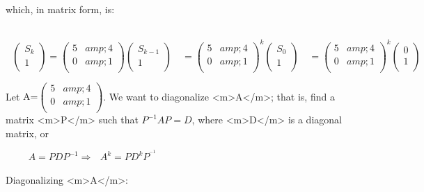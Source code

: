     which, in matrix form, is:



$\quad \quad $\(\text{     }\left(
\begin{array}{c}
 S_k \\
 1 \\
\end{array}
\right)=\left(
\begin{array}{cc}
 5 &amp; 4 \\
 0 &amp; 1 \\
\end{array}
\right)\left(
\begin{array}{c}
 S_{k-1} \\
 1 \\
\end{array}
\right)\quad =\left(
\begin{array}{cc}
 5 &amp; 4 \\
 0 &amp; 1 \\
\end{array}
\right)^k\left(
\begin{array}{c}
 S_0 \\
 1 \\
\end{array}
\right)\quad =\left(
\begin{array}{cc}
 5 &amp; 4 \\
 0 &amp; 1 \\
\end{array}
\right)^k\left(
\begin{array}{c}
 0 \\
 1 \\
\end{array}
\right)\quad\)



 



Let \(\text{A=}\left(
\begin{array}{cc}
 5 &amp; 4 \\
 0 &amp; 1 \\
\end{array}
\right)\).  We want to diagonalize <m>A</m>; that is,  find a matrix <m>P</m> such that \(P^{-1}A P = D\), where <m>D</m> is a diagonal
matrix,  or



$\quad \quad $ \(A =P D P^{-1} \Rightarrow \text{  }A^{k }=P D^kP^{\text{}^{-1}}\) 



Diagonalizing <m>A</m>:



